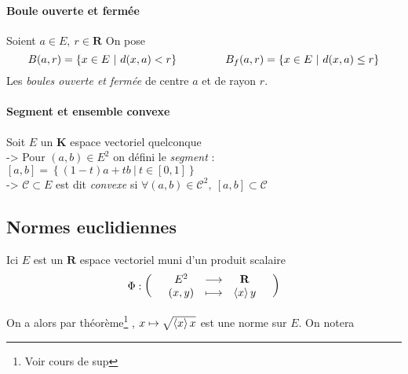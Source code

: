 			
		\newpage
			
		\traitd
		\paragraph{Boule ouverte et fermée} Soient $a\in E,~r\in\mathbf{R}$ On pose
			\[B(a,r) = \left\{ x\in E ~|~ d(x,a)<r\right\} \hspace*{1.5cm} B_f (a,r) = \left\{ x\in E ~|~ d(x,a) \leq r\right\}\]
			\hspace*{0.6cm} Les \emph{boules ouverte et fermée} de centre $a$ et de rayon $r$. 
		\traitdouble
		\paragraph{Segment et ensemble convexe} Soit $E$ un $\mathbf{K}$ espace vectoriel quelconque \vspace*{0.2cm}\\
			\hspace*{0.5cm} -> Pour $(a,b)\in E^2$ on défini le \emph{segment} : $[a,b]=\left\{ (1-t)a +tb ~\vert ~t\in [0,1]\right\}$ \\
			\hspace*{0.5cm} -> $\mathcal{C} \subset E$ est dit \emph{convexe} si $\forall (a,b)\in \mathcal{C}^2,~[a,b]\subset \mathcal{C}$
		\trait 
		
		 \medskip
		

	\subsection{Normes euclidiennes}
		Ici $E$ est un $\mathbf{R}$ espace vectoriel muni d'un produit scalaire\footnotemark[1] 
		\[
			\Phi :  \appli{E^2}{(x,y)}{\mathbf{R}}{\scal{x}{y}}
		\]
			
		
		On a alors par théorème\footnote[2]{Voir cours de sup} ,  $x\mapsto \sqrt{\scal{x}{x}}$ est une norme sur $E$.  
		On notera \begin{center}  \end{center} 
		
